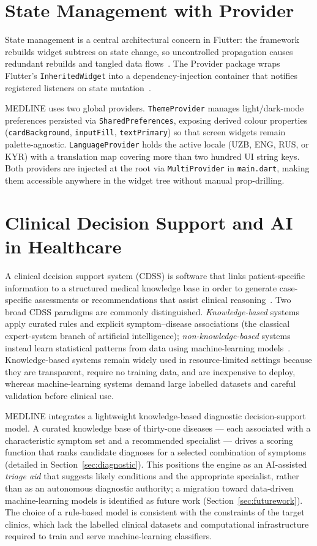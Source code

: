 \documentclass[12pt,a4paper,oneside]{report}
\begin{document}
\section{State Management with Provider}

State management is a central architectural concern in Flutter: the framework
rebuilds widget subtrees on state change, so uncontrolled propagation causes
redundant rebuilds and tangled data flows~\cite{windmill2020}. The Provider
package wraps Flutter's \texttt{InheritedWidget} into a dependency-injection
container that notifies registered listeners on state
mutation~\cite{provider2024}.

MEDLINE uses two global providers. \texttt{ThemeProvider} manages
light/dark-mode preferences persisted via \texttt{SharedPreferences}, exposing
derived colour properties (\texttt{cardBackground}, \texttt{inputFill},
\texttt{textPrimary}) so that screen widgets remain palette-agnostic.
\texttt{LanguageProvider} holds the active locale (UZB, ENG, RUS, or KYR) with
a translation map covering more than two hundred UI string keys. Both providers
are injected at the root via \texttt{MultiProvider} in \texttt{main.dart},
making them accessible anywhere in the widget tree without manual
prop-drilling.

\section{Clinical Decision Support and AI in Healthcare}

A clinical decision support system (CDSS) is software that links
patient-specific information to a structured medical knowledge base in order to
generate case-specific assessments or recommendations that assist clinical
reasoning~\cite{sutton2020}. Two broad CDSS paradigms are commonly
distinguished. \emph{Knowledge-based} systems apply curated rules and explicit
symptom--disease associations (the classical expert-system branch of artificial
intelligence); \emph{non-knowledge-based} systems instead learn statistical
patterns from data using machine-learning models~\cite{sutton2020}.
Knowledge-based systems remain widely used in resource-limited settings because
they are transparent, require no training data, and are inexpensive to deploy,
whereas machine-learning systems demand large labelled datasets and careful
validation before clinical use.

MEDLINE integrates a lightweight knowledge-based diagnostic decision-support
model. A curated knowledge base of thirty-one diseases --- each associated with
a characteristic symptom set and a recommended specialist --- drives a scoring
function that ranks candidate diagnoses for a selected combination of symptoms
(detailed in Section~\ref{sec:diagnostic}). This positions the engine as an
AI-assisted \emph{triage aid} that suggests likely conditions and the
appropriate specialist, rather than as an autonomous diagnostic authority; a
migration toward data-driven machine-learning models is identified as future
work (Section~\ref{sec:futurework}). The choice of a rule-based model is
consistent with the constraints of the target clinics, which lack the labelled
clinical datasets and computational infrastructure required to train and serve
machine-learning classifiers.
\end{document}
